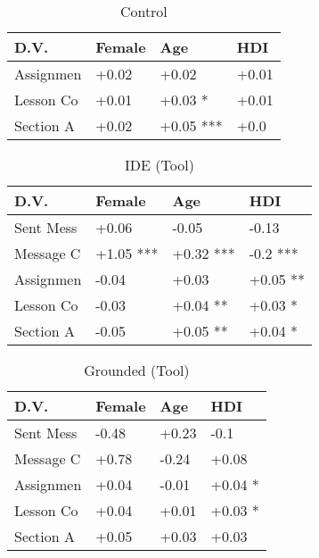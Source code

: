 \begin{table}[t]
\begin{center}
\begin{tabularx}{\columnwidth}{lXXX}
\toprule
D.V. & Female & Age & HDI \\
\midrule
Assignmen & +0.02 & +0.02 & +0.01 \\
Lesson Co & +0.01 & +0.03 * & +0.01 \\
Section A & +0.02 & +0.05 *** & +0.0 \\
\bottomrule
\end{tabularx}
\end{center}
\caption{Control}
\label{tab:demo_table}
\end{table}

\begin{table}[t]
\begin{center}
\begin{tabularx}{\columnwidth}{lXXX}
\toprule
D.V. & Female & Age & HDI \\
\midrule
Sent Mess & +0.06 & -0.05 & -0.13 \\
Message C & +1.05 *** & +0.32 *** & -0.2 *** \\
Assignmen & -0.04 & +0.03 & +0.05 ** \\
Lesson Co & -0.03 & +0.04 ** & +0.03 * \\
Section A & -0.05 & +0.05 ** & +0.04 * \\
\bottomrule
\end{tabularx}
\end{center}
\caption{IDE (Tool)}
\label{tab:demo_table}
\end{table}

\begin{table}[t]
\begin{center}
\begin{tabularx}{\columnwidth}{lXXX}
\toprule
D.V. & Female & Age & HDI \\
\midrule
Sent Mess & -0.48 & +0.23 & -0.1 \\
Message C & +0.78 & -0.24 & +0.08 \\
Assignmen & +0.04 & -0.01 & +0.04 * \\
Lesson Co & +0.04 & +0.01 & +0.03 * \\
Section A & +0.05 & +0.03 & +0.03 \\
\bottomrule
\end{tabularx}
\end{center}
\caption{Grounded (Tool)}
\label{tab:demo_table}
\end{table}

